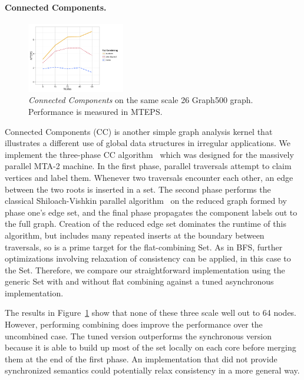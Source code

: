 \paragraph{Connected Components.}
\begin{figure}[t]
  \centering
  \includegraphics[width=0.38\textwidth]{data/plots/cc_perf.pdf}
  \caption{\emph{Connected Components} on the same scale 26 Graph500 graph. Performance is measured in MTEPS.}
  \label{fig:cc_perf}
\end{figure}
Connected Components (CC) is another simple graph analysis kernel that illustrates a different use of global data structures in irregular applications. We implement the three-phase CC algorithm~\cite{mtgl} which was designed for the massively parallel MTA-2 machine. In the first phase, parallel traversals attempt to claim vertices and label them.
Whenever two traversals encounter each other, an edge between the two roots is inserted in a set. 
The second phase performs the classical Shiloach-Vishkin parallel algorithm~\cite{shiloach1982n} on the reduced graph formed by phase one's edge set, and the final phase propagates the component labels out to the full graph.
Creation of the reduced edge set dominates the runtime of this algorithm, but includes many repeated inserts at the boundary between traversals, so is a prime target for the flat-combining Set.
As in BFS, further optimizations involving relaxation of consistency can be applied, in this case to the Set. Therefore, we compare our straightforward implementation using the generic Set with and without flat combining against a tuned asynchronous implementation.

The results in Figure~\ref{fig:cc_perf} show that none of these three scale well out to 64 nodes. However, performing combining does improve the performance over the uncombined case. The tuned version outperforms the synchronous version because it is able to build up most of the set locally on each core before merging them at the end of the first phase. An implementation that did not provide synchronized semantics could potentially relax consistency in a more general way.

